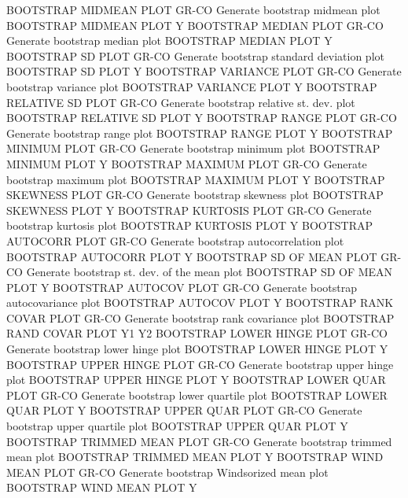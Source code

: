 BOOTSTRAP MIDMEAN PLOT      GR-CO Generate bootstrap midmean plot
                                  BOOTSTRAP MIDMEAN PLOT Y
BOOTSTRAP MEDIAN PLOT       GR-CO Generate bootstrap median plot
                                  BOOTSTRAP MEDIAN PLOT Y
BOOTSTRAP SD PLOT           GR-CO Generate bootstrap standard deviation plot
                                  BOOTSTRAP SD PLOT Y
BOOTSTRAP VARIANCE PLOT     GR-CO Generate bootstrap variance plot
                                  BOOTSTRAP VARIANCE PLOT Y
BOOTSTRAP RELATIVE SD PLOT  GR-CO Generate bootstrap relative st. dev. plot
                                  BOOTSTRAP RELATIVE SD PLOT Y
BOOTSTRAP RANGE PLOT        GR-CO Generate bootstrap range plot
                                  BOOTSTRAP RANGE PLOT Y
BOOTSTRAP MINIMUM PLOT      GR-CO Generate bootstrap minimum plot
                                  BOOTSTRAP MINIMUM PLOT Y
BOOTSTRAP MAXIMUM PLOT      GR-CO Generate bootstrap maximum plot
                                  BOOTSTRAP MAXIMUM PLOT Y
BOOTSTRAP SKEWNESS PLOT     GR-CO Generate bootstrap skewness plot
                                  BOOTSTRAP SKEWNESS PLOT Y
BOOTSTRAP KURTOSIS PLOT     GR-CO Generate bootstrap kurtosis plot
                                  BOOTSTRAP KURTOSIS PLOT Y
BOOTSTRAP AUTOCORR PLOT     GR-CO Generate bootstrap autocorrelation plot
                                  BOOTSTRAP AUTOCORR PLOT Y
BOOTSTRAP SD OF MEAN PLOT   GR-CO Generate bootstrap st. dev. of the mean plot
                                  BOOTSTRAP SD OF MEAN PLOT Y
BOOTSTRAP AUTOCOV PLOT      GR-CO Generate bootstrap autocovariance plot
                                  BOOTSTRAP AUTOCOV PLOT Y
BOOTSTRAP RANK COVAR PLOT   GR-CO Generate bootstrap rank covariance plot
                                  BOOTSTRAP RAND COVAR PLOT Y1 Y2
BOOTSTRAP LOWER HINGE PLOT  GR-CO Generate bootstrap lower hinge plot
                                  BOOTSTRAP LOWER HINGE PLOT Y
BOOTSTRAP UPPER HINGE PLOT  GR-CO Generate bootstrap upper hinge plot
                                  BOOTSTRAP UPPER HINGE PLOT Y
BOOTSTRAP LOWER QUAR PLOT   GR-CO Generate bootstrap lower quartile plot
                                  BOOTSTRAP LOWER QUAR PLOT Y
BOOTSTRAP UPPER QUAR PLOT   GR-CO Generate bootstrap upper quartile plot
                                  BOOTSTRAP UPPER QUAR PLOT Y
BOOTSTRAP TRIMMED MEAN PLOT GR-CO Generate bootstrap trimmed mean plot
                                  BOOTSTRAP TRIMMED MEAN PLOT Y
BOOTSTRAP WIND MEAN PLOT    GR-CO Generate bootstrap Windsorized mean plot
                                  BOOTSTRAP WIND MEAN PLOT Y
